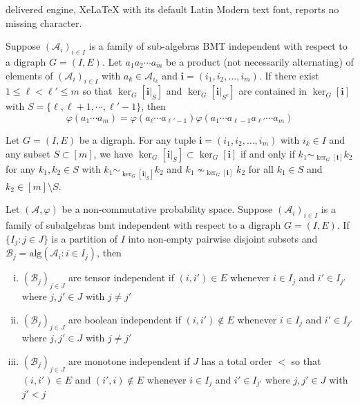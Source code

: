 \documentclass[10pt,a4paper]{amsart}
\begin{document}
delivered engine, XeLaTeX with its default Latin Modern text font, reports no missing character.
\begin{lem}\label{lem_weak_bm}
	Suppose $(\mathcal{A}_i)_{i \in I}$ is a family of sub-algebras BMT independent with respect to a digraph $G = (I,E)$. 
	Let $a_1 a_2 \cdots a_m$ be a product (not necessarily alternating) of elements of  $(\mathcal{A}_i)_{i \in I}$ with $a_k \in \mathcal{A}_{i_k}$ and $\bm{i} = (i_1, i_2,\ldots,i_m)$. 
	If there exist $1 \leq \ell < \ell' \leq m$ so that $\ker_{G}[\bm{i}|_S]$ and $\ker_{G}[\bm{i}|_{S^c}]$ are contained in $\ker_G[\bm{i}]$ with $S = \{ \ell,\ell+1,\cdots,\ell'-1\}$, then 
	$$\varphi(a_1  \cdots a_m) = \varphi(a_{\ell} \cdots a_{\ell'-1}) \varphi(a_1\cdots a_{\ell-1} a_{\ell'} \cdots a_m)$$
\end{lem}

\begin{lem}\label{lem_weak_bm_ver_kernel}
	Let $G = (I,E)$ be a digraph. For any tuple $\bm{i} = (i_1,i_2,\ldots,i_m)$ with $i_k \in I$ and any subset $S \subset [m]$, we have 
	$\ker_{G}[\bm{i}|_S] \subset \ker_G[\bm{i}]$ if and only if $k_1 \sim_{ \ker_G[\bm{i}]} k_2$ for any $k_1,k_2 \in S$ with $k_1 \sim_{ \ker_G[\bm{i}|_S]} k_2$ and $k_1 \nsim_{ \ker_G[\bm{i}]} k_2$ for all $k_1 \in S$ and $k_2 \in [m]\setminus S$. 
\end{lem}

\begin{prop}\label{prop_associativity}
	Let $(\mathcal{A},\varphi)$ be a non-commutative probability space. 
	Suppose $(\mathcal{A}_i)_{i \in I}$ is a family of subalgebras bmt independent with respect to a digraph $G = (I,E)$. 
	If $\{ I_j : j \in J \}$ is a partition of $I$ into non-empty pairwise disjoint subsets and $\mathcal{B}_j = \mathrm{alg}( \mathcal{A}_i : i \in I_j )$, then  
	\begin{enumerate}[(i)]
		
		
		\item $(\mathcal{B}_j)_{j \in J}$ are tensor independent if $(i,i') \in E$ whenever $i \in I_{j}$ and $i' \in I_{j'}$ where $j,j' \in J$ with $j \neq j'$  
		
		\item $(\mathcal{B}_j)_{j \in J}$ are boolean independent if $(i,i') \notin E$ whenever $i \in I_{j}$ and $i' \in I_{j'}$ where $j,j' \in J$ with $j \neq j'$  
		
		
		\item $(\mathcal{B}_j)_{j \in J}$ are monotone independent if $J$ has a total order $<$ so that $(i,i') \in E$ and $(i',i) \notin E$  whenever $i \in I_{j}$ and $i' \in I_{j'}$ where $j,j' \in J$ with $j' < j$   
		
		
		
	\end{enumerate}
\end{prop}
\end{document}
